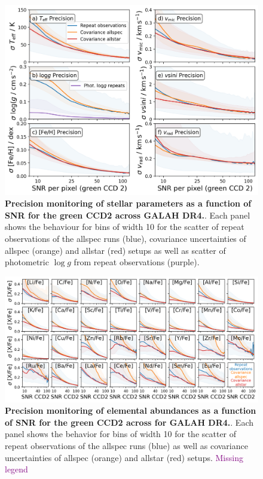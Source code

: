 \documentclass[
  journal=pasa,
  manuscript=research-paper, %
  year=2024,
  volume=37
]{cup-journal}
\newcommand{\SB}[1]{{\textcolor{purple}{#1}}}
\newcommand{\logg}{$\log g$\xspace}
\begin{document}
\begin{figure}[ht]
 \centering
 \includegraphics[width=\textwidth]{figures/galah_dr4_precision_parameters.png}
 \caption{\textbf{Precision monitoring of stellar parameters as a function of SNR for the green CCD2 across GALAH DR4.}. Each panel shows the behaviour for bins of width 10 for the scatter of repeat observations of the allspec runs (blue), covariance uncertainties of allspec (orange) and allstar (red) setups as well as scatter of photometric \logg from repeat observations (purple).}
 \label{fig:galah_dr4_precision_parameters}
\end{figure}

\begin{figure}[ht]
 \centering
 \includegraphics[width=\textwidth]{figures/galah_dr4_precision_abundances.png}
 \caption{\textbf{Precision monitoring of elemental abundances as a function of SNR for the green CCD2 across for GALAH DR4.}. Each panel shows the behavior for bins of width 10 for the scatter of repeat observations of the allspec runs (blue) as well as covariance uncertainties of allspec (orange) and allstar (red) setups. \SB{Missing legend}}
 \label{fig:galah_dr4_precision_abundances}
\end{figure}
\end{document}
